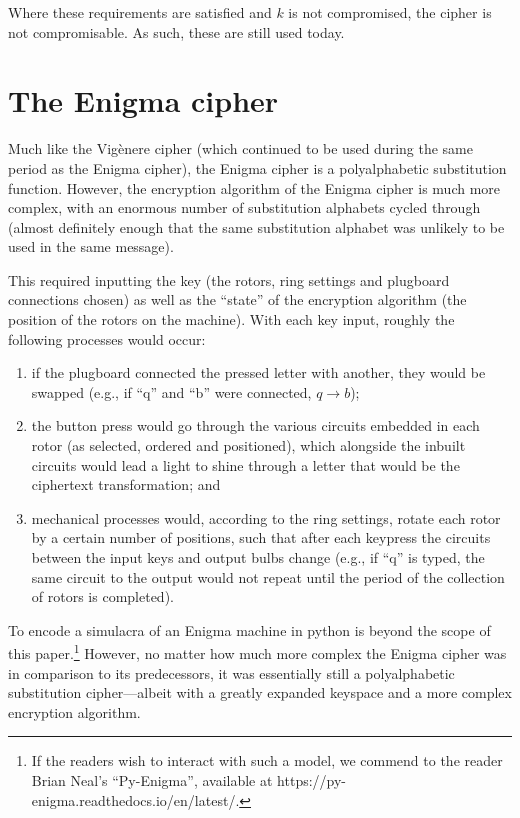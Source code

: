 \documentclass{AIAA}
\begin{document}
Where these requirements are satisfied and $k$ is not compromised, the cipher is not compromisable. As such, these are still used today.

\section{The Enigma cipher}
Much like the Vig\`enere cipher (which continued to be used during the same period as the Enigma cipher), the Enigma cipher is a polyalphabetic substitution function. However, the encryption algorithm of the Enigma cipher is much more complex, with an enormous number of substitution alphabets cycled through (almost definitely enough that the same substitution alphabet was unlikely to be used in the same message). 

This required inputting the key (the rotors, ring settings and plugboard connections chosen) as well as the ``state'' of the encryption algorithm (the position of the rotors on the machine). With each key input, roughly the following processes would occur:

\begin{enumerate}
\item if the plugboard connected the pressed letter with another, they would be swapped (e.g., if ``q'' and ``b'' were connected, $q \longrightarrow b$);
\item the button press would go through the various circuits embedded in each rotor (as selected, ordered and positioned), which alongside the inbuilt circuits would lead a light to shine through a letter that would be the ciphertext transformation; and
\item mechanical processes would, according to the ring settings, rotate each rotor by a certain number of positions, such that after each keypress the circuits between the input keys and output bulbs change (e.g., if ``q'' is typed, the same circuit to the output would not repeat until the period of the collection of rotors is completed).
\end{enumerate}

To encode a simulacra of an Enigma machine in python is beyond the scope of this paper.\footnote{If the readers wish to interact with such a model, we commend to the reader Brian Neal's ``Py-Enigma'', available at https://py-enigma.readthedocs.io/en/latest/.}  However, no matter how much more complex the Enigma cipher was in comparison to its predecessors, it was essentially still a polyalphabetic substitution cipher---albeit with a greatly expanded keyspace and a more complex encryption algorithm.
\end{document}
